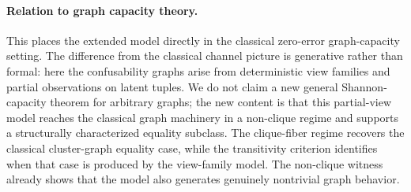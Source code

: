 \paragraph{Relation to graph capacity theory.}
This places the extended model directly in the classical zero-error graph-capacity setting. The difference from the classical channel picture is generative rather than formal: here the confusability graphs arise from deterministic view families and partial observations on latent tuples. We do not claim a new general Shannon-capacity theorem for arbitrary graphs; the new content is that this partial-view model reaches the classical graph machinery in a non-clique regime and supports a structurally characterized equality subclass. The clique-fiber regime recovers the classical cluster-graph equality case, while the transitivity criterion identifies when that case is produced by the view-family model. The non-clique witness already shows that the model also generates genuinely nontrivial graph behavior.
